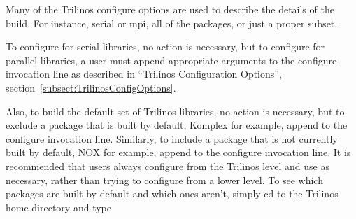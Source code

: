 Many of the Trilinos configure options are used to describe the details of the 
build.  For 
instance, serial or mpi, all of the packages, or just a proper subset.  

To configure for serial libraries, no action is necessary,
but to configure for parallel libraries, a user must append appropriate 
arguments to the configure invocation line as described in ``Trilinos 
Configuration Options'', section~\ref{subsect:TrilinosConfigOptions}.

Also, to build the default set of Trilinos libraries, no action is 
necessary, but to exclude a package that is built by default, Komplex for 
example, append \newline {} to the configure 
invocation  line.  Similarly, to include a package that is not currently built 
by default, NOX for example, append  to 
the configure invocation line.  It is recommended that users always configure 
from the Trilinos level and use  as 
necessary, rather than trying to configure from a lower level.  To see which 
packages are built by default and which ones aren't, simply cd to the Trilinos home directory and type 


